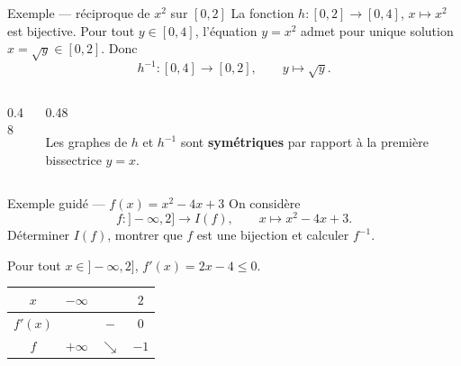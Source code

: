 \documentclass[aspectratio=169,11pt]{beamer}
\newcommand{\key}[1]{\textbf{\color{DarkBlue}#1}}
\newcommand{\fonc}[3]{#1\colon #2\to #3}
\begin{document}
\begin{frame}{Exemple --- réciproque de $x^2$ sur $[0,2]$}
	La fonction $\fonc{h}{[0,2]}{[0,4]}$, $x\longmapsto x^2$ est bijective.
	Pour tout $y\in[0,4]$, l'équation $y=x^2$ admet pour unique solution
	$x=\sqrt{y}\in[0,2]$. Donc
	\[
		h^{-1} \colon [0,4]\longrightarrow [0,2], \qquad y\longmapsto \sqrt{y}.
	\]
	\vspace{0.1cm}
	\begin{columns}[c]
		\begin{column}{0.48\textwidth}
		\end{column}
		\begin{column}{0.48\textwidth}
			\begin{applicationbox}
				Les graphes de $h$ et $h^{-1}$ sont \key{symétriques} par rapport
				à la première bissectrice $y=x$.
			\end{applicationbox}
		\end{column}
	\end{columns}
\end{frame}

\begin{frame}{Exemple guidé --- $f(x)=x^2-4x+3$}
	On considère
	\[
		\fonc{f}{]-\infty,2]}{I(f)}, \qquad x\longmapsto x^2-4x+3.
	\]
	Déterminer $I(f)$, montrer que $f$ est une bijection et calculer $f^{-1}$.
	\vspace{0.2cm}
	\begin{exemplebox}
		Pour tout $x\in]-\infty,2]$, $f'(x)=2x-4\le 0$.
		\vspace{0.1cm}
		\centering
		\renewcommand{\arraystretch}{1.25}
		\begin{tabular}{|c|ccc|}
			\hline
			$x$ & $-\infty$ && $2$ \\
			\hline
			$f'(x)$ && $-$ & $0$ \\
			\hline
			$f$ & $+\infty$ & $\searrow$ & $-1$ \\
			\hline
		\end{tabular}
	\end{exemplebox}
\end{frame}
\end{document}
